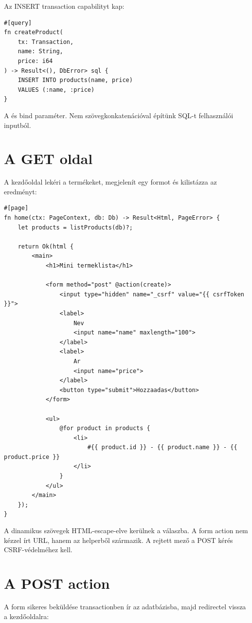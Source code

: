 Az INSERT transaction capabilityt kap:

\begin{lstlisting}[language=Velran]
#[query]
fn createProduct(
    tx: Transaction,
    name: String,
    price: i64
) -> Result<(), DbError> sql {
    INSERT INTO products(name, price)
    VALUES (:name, :price)
}
\end{lstlisting}

A  és  bind paraméter. Nem szövegkonkatenációval építünk SQL-t felhasználói inputból.

\section{A GET oldal}

A kezdőoldal lekéri a termékeket, megjelenít egy formot és kilistázza az eredményt:

\begin{lstlisting}[language=Velran]
#[page]
fn home(ctx: PageContext, db: Db) -> Result<Html, PageError> {
    let products = listProducts(db)?;

    return Ok(html {
        <main>
            <h1>Mini termeklista</h1>

            <form method="post" @action(create)>
                <input type="hidden" name="_csrf" value="{{ csrfToken }}">
                <label>
                    Nev
                    <input name="name" maxlength="100">
                </label>
                <label>
                    Ar
                    <input name="price">
                </label>
                <button type="submit">Hozzaadas</button>
            </form>

            <ul>
                @for product in products {
                    <li>
                        #{{ product.id }} - {{ product.name }} - {{ product.price }}
                    </li>
                }
            </ul>
        </main>
    });
}
\end{lstlisting}

A dinamikus szövegek HTML-escape-elve kerülnek a válaszba. A form action nem kézzel írt URL, hanem az  helperből származik. A rejtett  mező a POST kérés CSRF-védelméhez kell.

\section{A POST action}

A form sikeres beküldése transactionben ír az adatbázisba, majd redirectel vissza a kezdőoldalra:

